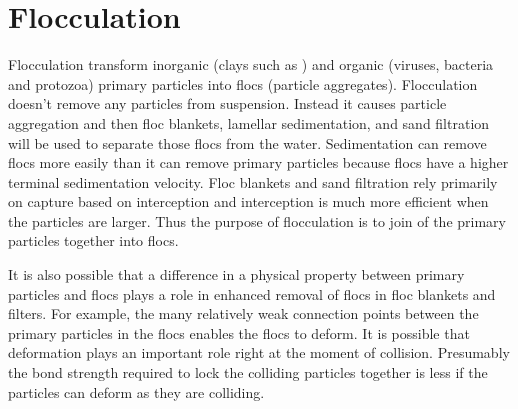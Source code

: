 \documentclass[letterpaper,10pt,english]{sphinxmanual}
\begin{document}
\section{Flocculation}
\label{\detokenize{Flocculation/Floc_Intro:flocculation}}
Flocculation transform inorganic (clays such as 
) and organic (viruses, bacteria and protozoa) primary particles into
flocs (particle aggregates). Flocculation doesn’t remove any particles
from suspension. Instead it causes particle aggregation and then floc
blankets, lamellar sedimentation, and sand filtration will be used to
separate those flocs from the water. Sedimentation can remove flocs more
easily than it can remove primary particles because flocs have a higher
terminal sedimentation velocity. Floc blankets and sand filtration rely
primarily on capture based on interception and interception is much more
efficient when the particles are larger. Thus the purpose of
flocculation is to join  of the primary particles together into
flocs.

It is also possible that a difference in a physical property between
primary particles and flocs plays a role in enhanced removal of flocs in
floc blankets and filters. For example, the many relatively weak
connection points between the primary particles in the flocs enables the
flocs to deform. It is possible that deformation plays an important role
right at the moment of collision. Presumably the bond strength required
to lock the colliding particles together is less if the particles can
deform as they are colliding.
\end{document}
